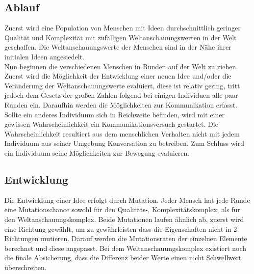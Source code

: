 \subsection{Ablauf}
Zuerst wird eine Population von Menschen mit Ideen durchschnittlich geringer Qualität und Komplexität mit zufälligen Weltanschauungswerten in der Welt geschaffen. 
Die Weltanschauungswerte der Menschen sind in der Nähe ihrer initialen Ideen angesiedelt. \\
Nun beginnen die verschiedenen Menschen in Runden auf der Welt zu ziehen. 
Zuerst wird die Möglichkeit der Entwicklung einer neuen Idee und/oder die Veränderung der Weltanschauungswerte evaluiert, diese ist relativ gering, tritt jedoch dem Gesetz der großen Zahlen folgend bei einigen Individuen alle paar Runden ein. 
Daraufhin werden die Möglichkeiten zur Kommunikation erfasst. Sollte ein anderes Individuum sich in Reichweite befinden, wird mit einer gewissen Wahrscheinlichkeit ein Kommunikationsversuch gestartet. 
Die Wahrscheinlichkeit resultiert aus dem menschlichen Verhalten nicht mit jedem Individuum aus seiner Umgebung Konversation zu betreiben.
Zum Schluss wird ein Individuum seine Möglichkeiten zur Bewegung evaluieren.

\subsection{Entwicklung}
Die Entwicklung einer Idee erfolgt durch Mutation.
Jeder Mensch hat jede Runde eine Mutationschance sowohl für den Qualitäts-, Komplexitätskomplex, als für den Weltanschauungskomplex.
Beide Mutationen laufen ähnlich ab, zuerst wird eine Richtung gewählt, um zu gewährleisten dass die Eigenschaften nicht in 2 Richtungen mutieren. 
Darauf werden die Mutationsraten der einzelnen Elemente berechnet und diese angepasst.
Bei dem Weltanschauungskomplex existiert noch die finale Absicherung, dass die Differenz beider Werte einen nicht Schwellwert überschreiten.
\newpage
